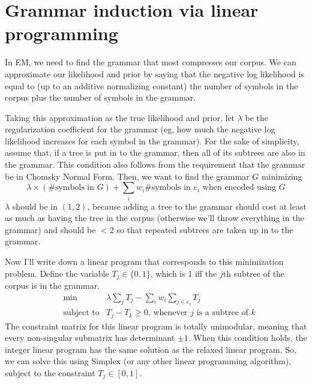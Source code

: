 \documentclass[12pt]{article}
\begin{document}
\section{Grammar induction via linear programming}
In EM, we need to find the grammar that most compresses our corpus.
We can approximate our likelihood and prior by saying that the negative log likelihood is equal to (up to an additive normalizing constant) the number of symbols in the corpus plus the number of symbols in the grammar.

Taking this approximation as the true likelihood and prior, let $\lambda$ be the regularization coefficient for the grammar (eg, how much the negative log likelihood increases for each symbol in the grammar).
For the sake of simplicity, assume that, if a tree is put in to the grammar, then all of its subtrees are also in the grammar.
This condition also follows from the requirement that the grammar be in Chomsky Normal Form.
Then, we want to find the grammar $G$ minimizing
$$
\lambda \times \left( \mbox{\# symbols in $G$}\right)+\sum_i w_i \mbox{\# symbols in $e_i$ when encoded using $G$}
$$
$\lambda$ should be in $(1,2)$, because adding a tree to the grammar should cost at least as much as having the tree in the corpus (otherwise we'll throw everything in the grammar) and should be $< 2$ so that repeated subtrees are taken up in to the grammar.

Now I'll write down a linear program that corresponds to this minimization problem.
Define the variable $T_j\in \{0,1\}$, which is 1 iff the $j$th subtree of the corpus is in the grammar.
\begin{eqnarray*}
&\min& \lambda \sum_j T_j - \sum_i w_i \sum_{j\in e_i} T_j\\
&\mbox{subject to}& T_j - T_k \geq 0\mbox{, whenever $j$ is a subtree of $k$}
\end{eqnarray*}
The constraint matrix for this linear program is totally unimodular, meaning that every non-singular submatrix has determinant $\pm 1$.
When this condition holds, the integer linear program has the same solution as the relaxed linear program.
So, we can solve this using Simplex (or any other linear programming algorithm), subject to the constraint $T_j\in [0,1]$.
\end{document}
